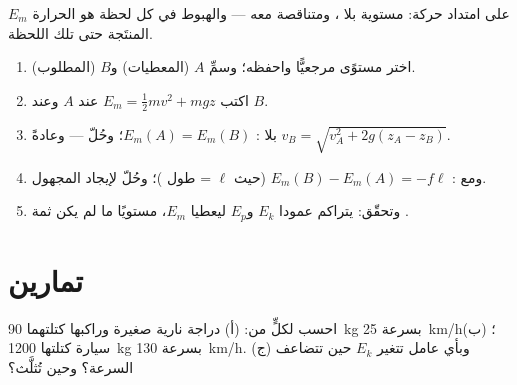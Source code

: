 \begin{omfigure}

{\small $E_m$ على امتداد حركة: مستوية بلا ، ومتناقصة
معه --- والهبوط في كل لحظة هو الحرارة المنتَجة حتى تلك اللحظة.}
\end{omfigure}

\begin{method}\label{met:g11:mechanical-energy:bookkeeping}
\begin{enumerate}
  \item اختر مستوًى مرجعيًّا واحفظه؛ وسمِّ $A$ (المعطيات) و$B$
        (المطلوب).
  \item اكتب $E_m = \tfrac12 mv^2 + mgz$ عند $A$ وعند $B$.
  \item بلا : $E_m(A) = E_m(B)$؛ وحُلّ --- وعادةً
        $v_B = \sqrt{v_A^2 + 2g(z_A - z_B)}$.
  \item ومع : $E_m(B) - E_m(A) = -f\ell$ (حيث $\ell$ = طول )؛
        وحُلّ لإيجاد المجهول.
  \item وتحقّق: يتراكم عمودا $E_k$ و$E_p$ ليعطيا $E_m$، مستويًا ما لم يكن ثمة .
\end{enumerate}
\end{method}

\section{تمارين}

\begin{exercise}[$\star$]\label{exo:g11:mechanical-energy:1}
احسب  لكلٍّ من: (أ) دراجة نارية صغيرة وراكبها كتلتهما \qty{90}{kg} بسرعة
\qty{25}{km/h}؛ (ب) سيارة كتلتها \qty{1200}{kg} بسرعة \qty{130}{km/h}. (ج) وبأي
عامل تتغير $E_k$ حين تتضاعف السرعة؟ وحين تُثلَّث؟
\end{exercise}

